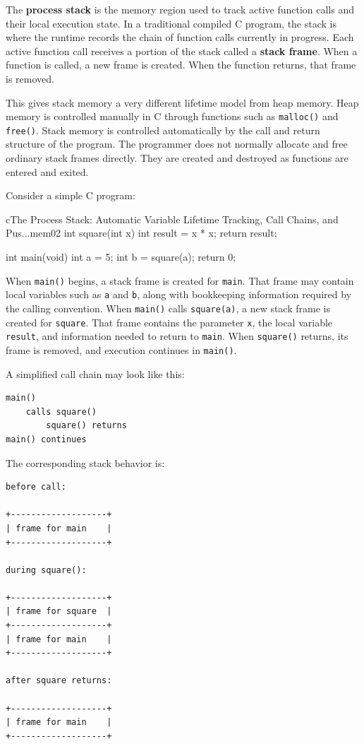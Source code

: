 The \textbf{process stack} is the memory region used to track active function calls and their local execution state. In a traditional compiled C program, the stack is where the runtime records the chain of function calls currently in progress. Each active function call receives a portion of the stack called a \textbf{stack frame}. When a function is called, a new frame is created. When the function returns, that frame is removed.

This gives stack memory a very different lifetime model from heap memory. Heap memory is controlled manually in C through functions such as \texttt{malloc()} and \texttt{free()}. Stack memory is controlled automatically by the call and return structure of the program. The programmer does not normally allocate and free ordinary stack frames directly. They are created and destroyed as functions are entered and exited.

Consider a simple C program:

\begin{codebox}[]{c}{The Process Stack: Automatic Variable Lifetime Tracking, Call Chains, and Pus...}{mem02}
int square(int x) {
    int result = x * x;
    return result;
}

int main(void) {
    int a = 5;
    int b = square(a);
    return 0;
}
\end{codebox}


When \texttt{main()} begins, a stack frame is created for \texttt{main}. That frame may contain local variables such as \texttt{a} and \texttt{b}, along with bookkeeping information required by the calling convention. When \texttt{main()} calls \texttt{square(a)}, a new stack frame is created for \texttt{square}. That frame contains the parameter \texttt{x}, the local variable \texttt{result}, and information needed to return to \texttt{main}. When \texttt{square()} returns, its frame is removed, and execution continues in \texttt{main()}.

A simplified call chain may look like this:

\begin{verbatim}
main()
    calls square()
        square() returns
main() continues
\end{verbatim}

The corresponding stack behavior is:

\begin{verbatim}
before call:

+-------------------+
| frame for main    |
+-------------------+

during square():

+-------------------+
| frame for square  |
+-------------------+
| frame for main    |
+-------------------+

after square returns:

+-------------------+
| frame for main    |
+-------------------+
\end{verbatim}

